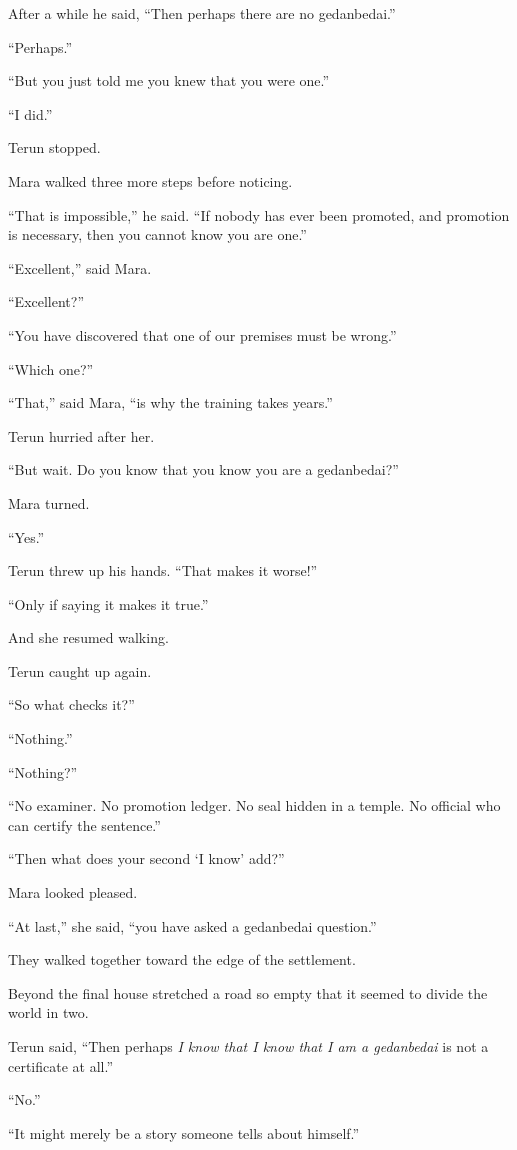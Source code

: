 \documentclass[11pt]{article}
\begin{document}
After a while he said, ``Then perhaps there are no gedanbedai.''

``Perhaps.''

``But you just told me you knew that you were one.''

``I did.''

Terun stopped.

Mara walked three more steps before noticing.

``That is impossible,'' he said. ``If nobody has ever been promoted, and promotion is necessary, then you cannot know you are one.''

``Excellent,'' said Mara.

``Excellent?''

``You have discovered that one of our premises must be wrong.''

``Which one?''

``That,'' said Mara, ``is why the training takes years.''

Terun hurried after her.

``But wait. Do you know that you know you are a gedanbedai?''

Mara turned.

``Yes.''

Terun threw up his hands. ``That makes it worse!''

``Only if saying it makes it true.''

And she resumed walking.

Terun caught up again.

``So what checks it?''

``Nothing.''

``Nothing?''

``No examiner. No promotion ledger. No seal hidden in a temple. No official who can certify the sentence.''

``Then what does your second `I know' add?''

Mara looked pleased.

``At last,'' she said, ``you have asked a gedanbedai question.''

They walked together toward the edge of the settlement.

Beyond the final house stretched a road so empty that it seemed to divide the world in two.

Terun said, ``Then perhaps \emph{I know that I know that I am a gedanbedai} is not a certificate at all.''

``No.''

``It might merely be a story someone tells about himself.''
\end{document}
